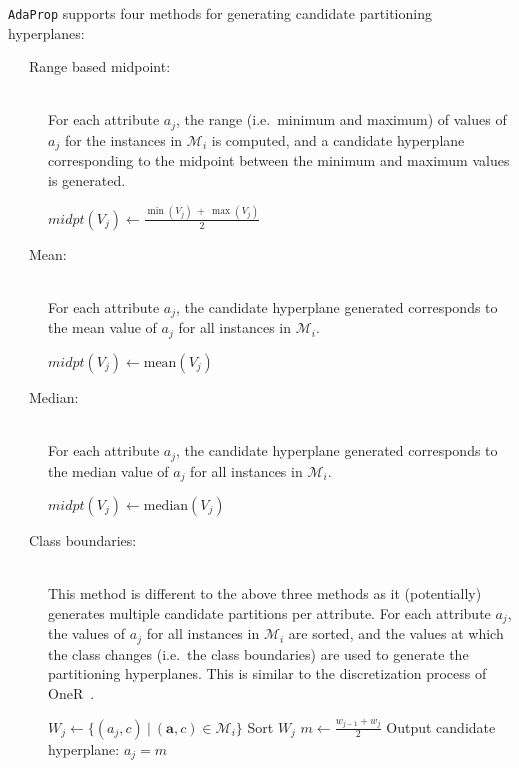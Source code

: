 \documentclass[a4paper,12pt]{report} %
\newcommand{\AdaProp}{\texttt{AdaProp}\xspace}
\newcommand{\mcl}[1]{\mathcal{#1}}
\newcommand{\vect}[1]{\boldsymbol{#1}}
\begin{document}
\AdaProp supports four methods for generating candidate partitioning hyperplanes:
\begin{description}

\item[~~~Range based midpoint:] \ \\
    For each attribute $a_j$, 
    the range (i.e.\ minimum and maximum) of 
        values of $a_j$ 
        for the instances in $\mcl{M}_i$ is computed, 
        and a candidate hyperplane corresponding to the midpoint between the 
        minimum and maximum values is generated.
    \begin{algorithmic}
        \State $midpt(V_j) \gets \frac{\min(V_j) ~+~ \max(V_j)}{2}$
    \end{algorithmic}
    
\item[~~~Mean:]  \ \\
    For each attribute $a_j$, 
        the candidate hyperplane generated corresponds to 
        the mean value of $a_j$ 
        for all instances in $\mcl{M}_i$.
    \begin{algorithmic}
        \State $midpt(V_j) \gets \textrm{mean}(V_j)$
    \end{algorithmic}    

\item[~~~Median:]  \ \\
    For each attribute $a_j$, 
        the candidate hyperplane generated corresponds to 
        the median value of $a_j$ 
        for all instances in $\mcl{M}_i$.
    \begin{algorithmic}
        \State $midpt(V_j) \gets \textrm{median}(V_j)$
    \end{algorithmic}  
    
\item[~~~Class boundaries:]  \ \\
    This method is different to the above three methods
        as it (potentially) generates multiple candidate partitions 
        per attribute.
    For each attribute $a_j$, 
        the values of $a_j$ for all instances in $\mcl{M}_i$ are sorted,
        and the values at which the class changes (i.e.\ the class boundaries)
        are used to generate the partitioning hyperplanes.
    This is similar to the discretization process of OneR~\cite{holte}.
    \begin{algorithmic}
        \State $W_j \gets \{ (a_j,c) ~\big|~ (\vect{a},c) \in \mcl{M}_i \}$
        \State Sort $W_j$
            \State $m \gets \frac{w_{j-1}+w_j}{2}$
            \State Output candidate hyperplane: $a_j = m$
        \EndFor
    \EndFor
    \end{algorithmic}
\end{description}
\end{document}
